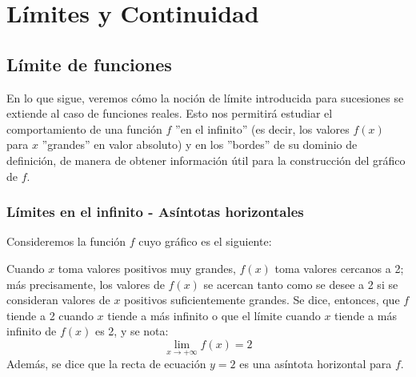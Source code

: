 \documentclass[../Teoría.root.tex]{subfiles}
\begin{document}
\section{Límites y Continuidad}
\subsection{Límite de funciones}
En lo que sigue, veremos cómo la noción de límite introducida para sucesiones se extiende al caso de funciones reales.
Esto nos permitirá estudiar el comportamiento de una función \(f\) ”en el infinito” (es decir, los valores \(f(x)\) para \(x\) ”grandes” en valor absoluto) y en los ”bordes” de su dominio de definición, de manera de obtener información útil para la construcción del gráfico de \(f\).
\subsubsection{Límites en el infinito - Asíntotas horizontales}
Consideremos la función \(f\) cuyo gráfico es el siguiente:
\begin{center}
\end{center}
Cuando \(x\) toma valores positivos muy grandes, \(f(x)\) toma valores cercanos a 2;
más precisamente, los valores de \(f(x)\) se acercan tanto como se desee a 2 si se consideran valores de \(x\) positivos suficientemente grandes.
Se dice, entonces, que \(f\) tiende a 2 cuando \(x\) tiende a más infinito o que el límite cuando \(x\) tiende a más infinito de \(f(x)\) es 2, y se nota:
\[\lim_{x\to+\infty}f(x)=2\]
Además, se dice que la recta de ecuación \(y=2\) es una asíntota horizontal para \(f\).
\end{document}
